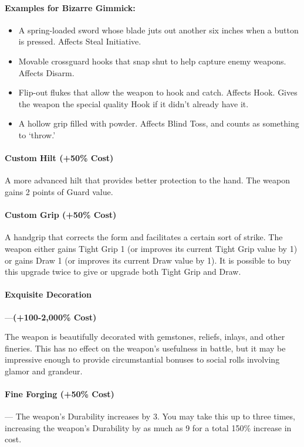 \documentclass[oneside,11pt,english]{book}
\begin{document}
\paragraph{Examples for Bizarre Gimmick:}
\begin{itemize}
\item A spring-loaded sword whose blade juts out another six inches when a button is pressed. Affects Steal Initiative.
\item Movable crossguard hooks that snap shut to help capture enemy weapons. Affects Disarm.
\item Flip-out flukes that allow the weapon to hook and catch. Affects Hook. Gives the weapon the special quality Hook if it didn’t already have it.
\item A hollow grip filled with powder. Affects Blind Toss, and counts as something to ‘throw.’
\end{itemize}
\paragraph{Custom Hilt (+50\% Cost)}\par
A more advanced hilt that provides better protection to the hand. The weapon gains 2 points of Guard value.
\paragraph{Custom Grip (+50\% Cost)}\par
A handgrip that corrects the form and facilitates a certain sort of strike. The
weapon either gains Tight Grip 1 (or improves its current Tight Grip value by 1)
or gains Draw 1 (or improves its current Draw value by 1). It is possible to buy
this upgrade twice to give or upgrade both Tight Grip and Draw. 
\paragraph{Exquisite Decoration}---\quad \textbf{(+100-2,000\% Cost)} \par
The weapon is beautifully decorated with gemstones, reliefs, inlays, and other
fineries. This has no effect on the weapon’s usefulness in battle, but it may be
impressive enough to provide circumstantial bonuses to social rolls involving
glamor and grandeur. 

\paragraph{Fine Forging (+50\% Cost)}---\quad
The weapon’s Durability increases by 3. You may take this up to three times, increasing the weapon’s Durability by as much as 9 for a total 150\% increase in cost.
\end{document}
